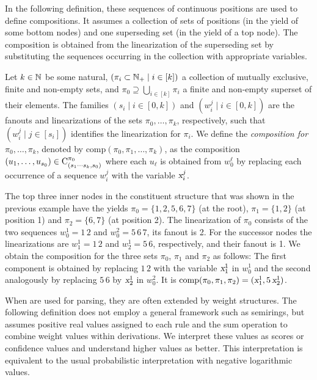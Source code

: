 \documentclass[../../document.tex]{subfiles}
\begin{document}
    In the following definition, these sequences of continuous positions are used to define  compositions.
    It assumes a collection of sets of positions (in the yield of some bottom nodes) and one superseding set (in the yield of a top node).
    The composition is obtained from the linearization of the superseding set by substituting the sequences occurring in the collection with appropriate variables.

    \begin{definition}
        Let \(k \in \mathbb{N}\) be some natural, \((\pi_i \subset \mathbb{N}_+ \mid i \in [k])\) a collection of mutually exclusive, finite and non-empty sets, and \(\pi_0 \supseteq \bigcup_{i \in [k]} \pi_i\) a finite and non-empty superset of their elements.
        The families \((s_i \mid i \in [0,k])\) and \((w_i^j \mid i \in [0,k])\) are the fanouts and linearizations of the sets \(\pi_0, \ldots, \pi_k\), respectively, such that \((w_i^j \mid j \in [s_i])\) identifies the linearization for \(\pi_i\).
        We define the \emph{composition for \(\pi_0, \ldots, \pi_k\)}, denoted by \(\mathrm{comp}(\pi_0, \pi_1, \ldots, \pi_k)\), as the composition \((u_1, \ldots, u_{s_0}) \in \mathrm{C}^{\pi_0}_{(s_1\cdots s_k, s_0)}\) where each \(u_\ell\) is obtained from \(w_0^\ell\) by replacing each occurrence of a sequence \(w_i^j\) with the variable \(\textsl{x}_i^j\).
    \end{definition}

    \begin{example}
        The top three inner nodes in the constituent structure that was shown in the previous example have the yields \(\pi_0 = \{1,2,5,6,7\}\) (at the root), \(\pi_1 = \{1,2\}\) (at position 1) and \(\pi_2 = \{6,7\}\) (at position 2).
        The linearization of \(\pi_0\) consists of the two sequences \(w_0^1 = 1\,2\) and \(w_0^2 = 5\,6\,7\), its fanout is 2.
        For the successor nodes the linearizations are \(w_1^1 = 1\,2\) and \(w_2^1 = 5\,6\), respectively, and their fanout is 1.
        We obtain the composition for the three sets \(\pi_0\), \(\pi_1\) and \(\pi_2\) as follows:
            The first component is obtained by replacing \(1\,2\) with the variable \(\textsl{x}_1^1\) in \(w_0^1\) and the second analogously by replacing \(5\,6\) by \(\textsl{x}_2^1\) in \(w_0^2\).
        It is \(\mathrm{comp}(\pi_0, \pi_1, \pi_2) = (\textsl{x}_1^1, 5\,\textsl{x}_2^1)\).
    \end{example}

    When  are used for parsing, they are often extended by weight structures.
    The following definition does not employ a general framework such as semirings, but assumes positive real values assigned to each rule and the sum operation to combine weight values within derivations.
    We interpret these values as scores or confidence values and understand higher values as better.
    This interpretation is equivalent to the usual probabilistic interpretation \citep[cf.][Viterbi semiring]{Goodman} with negative logarithmic values.
\end{document}
